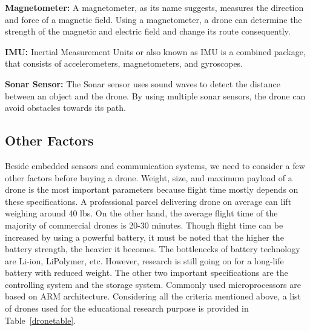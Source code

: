 \textbf{Magnetometer:}
A magnetometer, as its name suggests, measures the direction and force of a magnetic field. Using a magnetometer, a drone can determine the strength of the magnetic and electric field and change its route consequently.

\textbf{IMU:}
Inertial Measurement Units or also known as IMU is a combined package, that consists of accelerometers, magnetometers, and gyroscopes.

\textbf{Sonar Sensor:}
The Sonar sensor uses sound waves to detect the distance between an object and the drone. By using multiple sonar sensors, the drone can avoid obstacles towards its path.

\subsection{Other Factors}
Beside embedded sensors and communication systems, we need to consider a few other factors before buying a drone. Weight, size, and maximum payload of a drone is the most important parameters because flight time mostly depends on these specifications. A professional parcel delivering drone on average can lift weighing around 40 lbs. On the other hand, the average flight time of the majority of commercial drones is 20-30 minutes. Though flight time can be increased by using a powerful battery, it must be noted that the higher the battery strength, the heavier it becomes. The bottlenecks of battery technology are Li-ion, LiPolymer, etc. However, research is still going on for a long-life battery with reduced weight. The other two important specifications are the controlling system and the storage system. Commonly used microprocessors are based on ARM architecture. Considering all the criteria mentioned above, a list of drones used for the educational research purpose is provided in Table~\ref{dronetable}.


